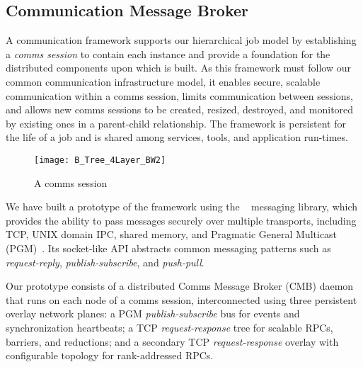\subsection{Communication Message Broker}

A communication framework supports our hierarchical job model
by establishing a {\em comms session} to contain each \flux instance
and provide a foundation for the distributed components upon which
\flux is built.
As this framework must follow our common communication infrastructure
model, it enables secure, scalable communication
within a comms session, limits communication between sessions,
and allows new comms sessions to be created, resized, destroyed,
and monitored by existing ones in a parent-child relationship.
The framework is persistent for the life of a \flux job and is 
shared among \flux services, tools, and application run-times.

\begin{figure}
\centering
\texttt{[image: B\_Tree\_4Layer\_BW2]}
\vspace{.8cm}
\caption{A comms session} 
\vspace{-.5cm}
\label{fig:commswireup}
\end{figure}

We have built a prototype of the framework using the \zMQ~\cite{ZMQGuide}
messaging library, which provides the ability to pass messages securely
over multiple transports, including TCP, UNIX domain IPC, shared memory, and
Pragmatic General Multicast (PGM)~\cite{rfc3208}.
Its socket-like API abstracts common messaging patterns such as
{\em request-reply}, {\em publish-subscribe},
and {\em push-pull}.

Our prototype consists of a distributed Comms Message Broker (CMB)
daemon that runs on each node of a comms session, interconnected using
three persistent overlay network planes:
a PGM {\em publish-subscribe} bus for events and synchronization heartbeats;
a TCP {\em request-response} tree for scalable RPCs, barriers, and reductions; and
a secondary TCP {\em request-response} overlay with configurable topology
for rank-addressed RPCs.



